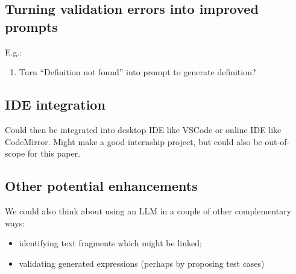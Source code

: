 \subsection{Turning validation errors into improved prompts}
E.g.:
\begin{enumerate}
\item Turn ``Definition not found'' into prompt to generate definition?
\end{enumerate}

\subsection{IDE integration}

Could then be integrated into desktop IDE like VSCode or online IDE like CodeMirror. Might make a good
internship project, but could also be out-of-scope for this paper.

\subsection{Other potential enhancements}

We could also think about using an LLM in a couple of other complementary ways:
\begin{itemize}
\item identifying text fragments which might be linked;
\item validating generated expressions (perhaps by proposing test cases)
\end{itemize}
